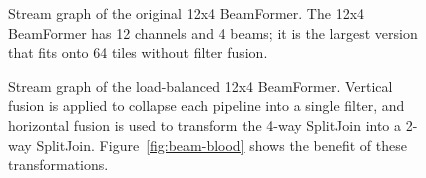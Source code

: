 \begin{figure}
\centering
{}
\caption{\protect\small Stream graph of the original 12x4 BeamFormer.  The 12x4 BeamFormer has 12 channels and 4 beams; it is the largest version that fits onto 64 tiles without filter fusion.  \protect\label{fig:beam-orig}}
\vspace{36pt}
\caption{\protect\small Stream graph of the load-balanced 12x4 BeamFormer.  Vertical fusion is applied to collapse each pipeline into a single filter, and horizontal fusion is used to transform the 4-way SplitJoin into a 2-way SplitJoin.
Figure~\ref{fig:beam-blood} shows the benefit of these
transformations. \protect\label{fig:beam-opt}}
\end{figure}
